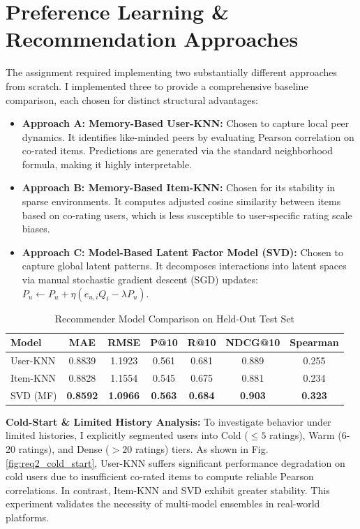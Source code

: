 \documentclass[conference]{IEEEtran}
\begin{document}
\section{Preference Learning \& Recommendation Approaches}
The assignment required implementing two substantially different approaches from scratch. I implemented three to provide a comprehensive baseline comparison, each chosen for distinct structural advantages:

\begin{itemize}[leftmargin=*]
    \item \textbf{Approach A: Memory-Based User-KNN:} Chosen to capture local peer dynamics. It identifies like-minded peers by evaluating Pearson correlation on co-rated items. Predictions are generated via the standard neighborhood formula, making it highly interpretable.
    \item \textbf{Approach B: Memory-Based Item-KNN:} Chosen for its stability in sparse environments. It computes adjusted cosine similarity between items based on co-rating users, which is less susceptible to user-specific rating scale biases.
    \item \textbf{Approach C: Model-Based Latent Factor Model (SVD):} Chosen to capture global latent patterns. It decomposes interactions into latent spaces via manual stochastic gradient descent (SGD) updates: $P_u \leftarrow P_u + \eta(e_{u,i}Q_i - \lambda P_u)$.
\end{itemize}

\begin{table}[!t]
\caption{Recommender Model Comparison on Held-Out Test Set}
\label{tab:model_comparison}
\centering
\small
\begin{tabular}{lcccccc}
\toprule
\textbf{Model} & \textbf{MAE} & \textbf{RMSE} & \textbf{P@10} & \textbf{R@10} & \textbf{NDCG@10} & \textbf{Spearman} \\
\midrule
User-KNN & 0.8839 & 1.1923 & 0.561 & 0.681 & 0.889 & 0.255 \\
Item-KNN & 0.8828 & 1.1554 & 0.545 & 0.675 & 0.881 & 0.234 \\
SVD (MF) & \textbf{0.8592} & \textbf{1.0966} & \textbf{0.563} & \textbf{0.684} & \textbf{0.903} & \textbf{0.323} \\
\bottomrule
\end{tabular}
\end{table}

\textbf{Cold-Start \& Limited History Analysis:} To investigate behavior under limited histories, I explicitly segmented users into Cold ($\le 5$ ratings), Warm (6-20 ratings), and Dense ($>20$ ratings) tiers. As shown in Fig. \ref{fig:req2_cold_start}, User-KNN suffers significant performance degradation on cold users due to insufficient co-rated items to compute reliable Pearson correlations. In contrast, Item-KNN and SVD exhibit greater stability. This experiment validates the necessity of multi-model ensembles in real-world platforms.
\end{document}
